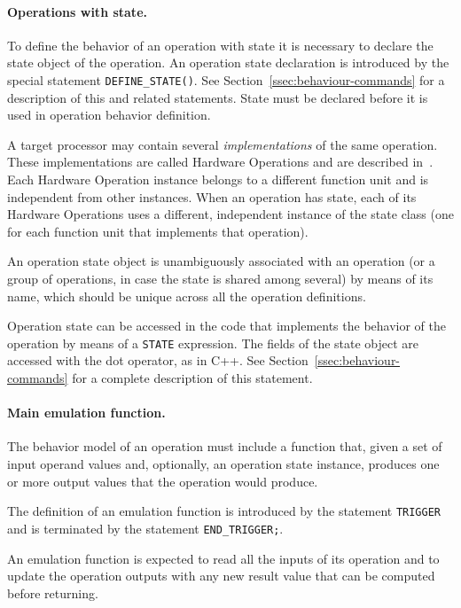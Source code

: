 \documentclass[a4paper,twoside]{tceusermanual}
\begin{document}
\paragraph{Operations with state.}

To define the behavior of an operation with state it is necessary to
declare the state object of the operation.  An operation state declaration
is introduced by the special statement \verb#DEFINE_STATE()#.  See
Section~\ref{ssec:behaviour-commands} for a description of this and related
statements. State must be declared before it is used in operation behavior
definition. 

A target processor may contain several \emph{implementations} of the
same operation.  These implementations are called Hardware Operations and
are described in~\cite{ADF-specs}.
%
Each Hardware Operation instance belongs to a different function unit and is
independent from other instances.
%
When an operation has state, each of its Hardware Operations uses a
different, independent instance of the state class (one for each function
unit that implements that operation).

An operation state object is unambiguously associated with an operation (or
a
group of operations, in case the state is shared among several) by means of
its name, which should be unique across all the operation definitions.%

Operation state can be accessed in the code that implements the behavior of
the operation by means of a \verb#STATE# expression.  The fields of the
state object are accessed with the dot operator, as in C++.  See
Section~\ref{ssec:behaviour-commands} for a complete description of this
statement.

\paragraph{Main emulation function.}
The behavior model of an operation must include a function that, given a
set of input operand values and, optionally, an operation state instance,
produces one or more output values that the operation would produce.

The definition of an emulation function is introduced by the statement
\verb#TRIGGER# and is terminated by the statement \verb#END_TRIGGER;#.  

An emulation function is expected to read all the inputs of its operation
and to update the operation outputs with any new result value that can be
computed before returning.
\end{document}
